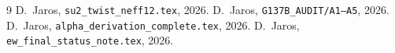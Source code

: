 \documentclass[12pt,a4paper]{article}
\theoremstyle{remark}\newtheorem{remark}[theorem]{Remark}
\begin{document}
\begin{thebibliography}{9}
  D.~Jaros, \texttt{su2\_twist\_neff12.tex}, 2026.
  D.~Jaros, \texttt{G137B\_AUDIT/A1--A5}, 2026.
  D.~Jaros, \texttt{alpha\_derivation\_complete.tex}, 2026.
  D.~Jaros, \texttt{ew\_final\_status\_note.tex}, 2026.
\end{thebibliography}

\ifdefined\INCLUDEMODE\else
\end{document}
